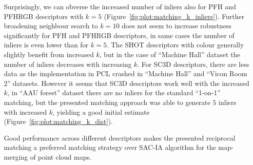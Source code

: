 Surprisingly, we can obverse the increased number of inliers also for \gls{PFH} and \gls{PFHRGB} descriptors with $k=5$ (Figure~\ref{fig:plot:matching_k_inliers}). Further broadening neighbour search to $k=10$ does not seem to increase robustness significantly for \gls{PFH} and \gls{PFHRGB} descriptors, in same cases the number of inliers is even lower than for $k=5$. The \gls{SHOT} descriptors with colour generally slightly benefit from increased $k$, but in the case of ``Machine Hall'' dataset the number of inliers decreases with increasing $k$. For \gls{SC3D} descriptors, there are less data as the implementation in \gls{PCL} crashed in ``Machine Hall'' and ``Vicon Room 2'' datasets. However it seems that \gls{SC3D} descriptors work well with the increased $k$, in ``AAU forest'' dataset there are no inliers for the standard ``1-on-1'' matching, but the presented matching approach was able to generate $5$ inliers with increased $k$, yielding a good initial estimate (Figure~\ref{fig:plot:matching_k_dist}).

Good performance across different descriptors makes the presented reciprocal matching a preferred matching strategy over \gls{SAC-IA} algorithm for the map-merging of point cloud maps.

